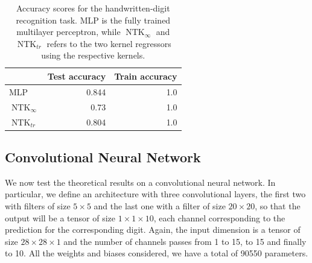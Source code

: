 \documentclass[11pt,notitlepage]{article}
\numberwithin{equation}{section}
\DeclareMathOperator{\NTK}{NTK}
\theoremstyle{remark}
\theoremstyle{definition}
\begin{document}
	\begin{table}[th!]
		\centering
		\begin{tabular}{l|r|r}
			& Test accuracy & Train accuracy\\
			\hline
			MLP & 0.844 & 1.0 \\
			$\NTK_\infty$ & 0.73 & 1.0 \\
			$\NTK_{tr}$ & 0.804 & 1.0
		\end{tabular}
		\caption{Accuracy scores for the handwritten-digit recognition task. MLP is the fully trained multilayer perceptron, while $\NTK_\infty$ and $\NTK_{tr}$ refers to the two kernel regressors using the respective kernels.}
		\label{tab:ntkScores}
	\end{table}
	
	\subsection{Convolutional Neural Network}
	
	We now test the theoretical results on a convolutional neural network.
	In particular, we define an architecture with three convolutional layers, the first two with filters of size $5\times 5$ and the last one with a filter of size $20 \times 20$, so that the output will be a tensor of size $1 \times 1 \times 10$, each channel corresponding to the prediction for the corresponding digit.
	Again, the input dimension is a tensor of size $28 \times 28 \times 1$ and the number of channels passes from 1 to 15, to 15 and finally to 10.
	All the weights and biases considered, we have a total of 90550 parameters.
	
\end{document}
